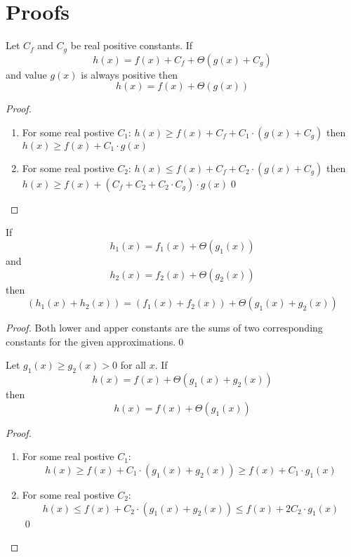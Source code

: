 \section{Proofs}
\label{sec:proofs_appendix}

\begin{lemma}
\label{lem:theta_constant}
Let $C_f$ and $C_g$ be real positive constants. If
\[ h(x) = f(x) + C_f + \Theta(g(x) + C_g) \]
and value $g(x)$ is always positive then
\[ h(x) = f(x) + \Theta(g(x)) \]
\end{lemma}
\begin{proof}
\begin{enumerate}
\item For some real  postive $C_1$: $h(x) \ge f(x) + C_f + C_1 \cdot (g(x) + C_g)$ then \\ $h(x) \ge f(x) + C_1 \cdot g(x)$
\item For some real  postive $C_2$: $h(x) \le f(x) + C_f + C_2 \cdot (g(x) + C_g)$ then \\ $h(x) \ge f(x) + (C_f + C_2 + C_2 \cdot C_g) \cdot g(x)$\qed
\end{enumerate}
\end{proof}

\begin{lemma}
\label{lem:theta_sum}
If
\[ h_1(x) = f_1(x) + \Theta(g_1(x)) \]
and
\[ h_2(x) = f_2(x) + \Theta(g_2(x)) \]
then
\[ (h_1(x) + h_2(x)) = (f_1(x) + f_2(x)) + \Theta(g_1(x) + g_2(x)) \]
\end{lemma}
\begin{proof}
Both lower and apper constants are the sums of two corresponding constants for the given approximations.\qed
\end{proof}

\begin{lemma}
\label{lem:theta_absorb}
Let $g_1(x) \ge g_2(x) > 0$ for all $x$.
If
\[ h(x) = f(x) + \Theta(g_1(x) + g_2(x)) \]
then
\[ h(x) = f(x) + \Theta(g_1(x)) \]
\end{lemma}
\begin{proof}
\begin{enumerate}
\item For some real  postive $C_1$: \[ h(x) \ge f(x) + C_1 \cdot (g_1(x) + g_2(x)) \ge f(x) + C_1 \cdot g_1(x) \]
\item For some real  postive $C_2$: \[ h(x) \le f(x) + C_2 \cdot (g_1(x) + g_2(x)) \le f(x) + 2 C_2 \cdot g_1(x) \]\qed
\end{enumerate}
\end{proof}

